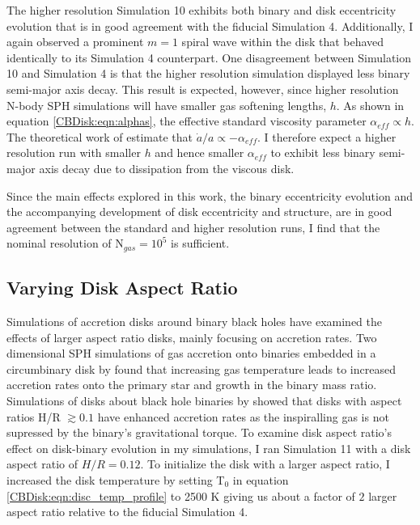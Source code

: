  The higher resolution Simulation 10 exhibits both binary and disk eccentricity evolution that is in good agreement with the fiducial Simulation 4.  
 Additionally, I again observed a prominent $m = 1$ spiral wave within the disk that behaved identically to its Simulation 4 counterpart.  One disagreement 
 between Simulation 10 and Simulation 4 is that the higher resolution simulation displayed less binary semi-major axis decay.  This result is expected, 
 however, since higher resolution N-body SPH simulations will have smaller gas softening lengths, $h$.  As shown in equation \ref{CBDisk:eqn:alphas}, the effective 
 standard viscosity parameter $\alpha_{eff} \propto h$.  The theoretical work of \citet{Artymowicz1996b,Artymowicz2000} estimate that $\dot{a}/a 
 \propto -\alpha_{eff}$.  I therefore expect a higher resolution run with smaller $h$ and hence smaller $\alpha_{eff}$ to exhibit less binary semi-major axis 
 decay due to dissipation from the viscous disk.
 
Since the main effects explored in this work, the binary eccentricity evolution and the accompanying development of disk eccentricity and structure, are 
in good agreement between the standard and higher resolution runs, I find that the nominal resolution of N$_{gas} = 10^5$ is sufficient.

	
\subsection{Varying Disk Aspect Ratio}

Simulations of accretion disks around binary black holes have examined the effects of larger aspect ratio disks, mainly focusing on accretion rates.  
Two dimensional SPH simulations of gas accretion onto binaries embedded in a circumbinary disk by \citet{Young2015} found that increasing gas temperature 
leads to increased accretion rates onto the primary star and growth in the binary mass ratio.  Simulations of disks about black hole binaries by \citet{Ragusa2016} 
showed that disks with aspect ratios H/R $\gtrsim 0.1$ have enhanced accretion rates as the inspiralling gas is not supressed by the binary's gravitational 
torque.  To examine disk aspect ratio's effect on disk-binary evolution in my simulations, I ran Simulation 11 with a disk aspect ratio of $H/R = 0.12$.  To 
initialize the disk with a larger aspect ratio, I increased the disk temperature by setting T$_0$ in equation \ref{CBDisk:eqn:disc_temp_profile} to 2500 K giving us 
about a factor of $2$ larger aspect ratio relative to the fiducial Simulation 4.

